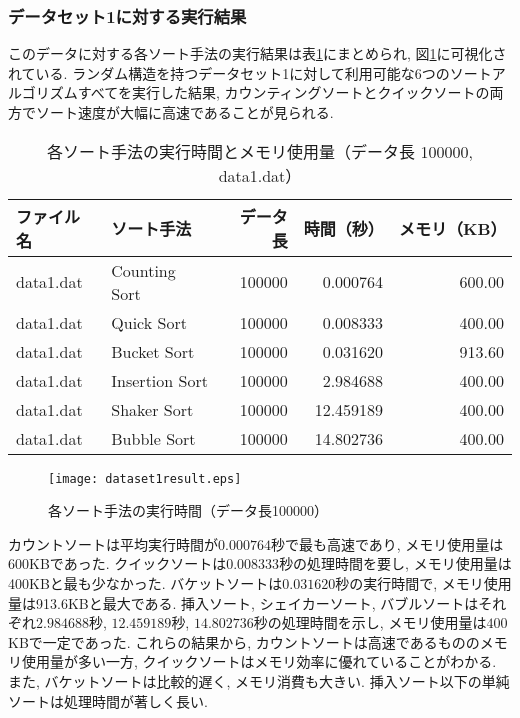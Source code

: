 \documentclass[a4j, 11pt]{jarticle}
\begin{document}
\subsubsection{データセット1に対する実行結果}
このデータに対する各ソート手法の実行結果は表\ref{dataset1allresult}にまとめられ, 図\ref{dataset1allresultgraph}に可視化されている. ランダム構造を持つデータセット1に対して利用可能な6つのソートアルゴリズムすべてを実行した結果, カウンティングソートとクイックソートの両方でソート速度が大幅に高速であることが見られる.  \
\begin{table}[H]
  \centering
  \caption{各ソート手法の実行時間とメモリ使用量（データ長 100000, data1.dat）}\label{dataset1allresult}
  \begin{tabular}{|l|l|r|r|r|}
    \hline
    \textbf{ファイル名} & \textbf{ソート手法} & \textbf{データ長} & \textbf{時間（秒）} & \textbf{メモリ（KB）} \\
    \hline
    data1.dat & Counting Sort  & 100000 & 0.000764  & 600.00 \\
    data1.dat & Quick Sort     & 100000 & 0.008333  & 400.00 \\
    data1.dat & Bucket Sort    & 100000 & 0.031620  & 913.60 \\
    data1.dat & Insertion Sort & 100000 & 2.984688  & 400.00 \\
    data1.dat & Shaker Sort    & 100000 & 12.459189 & 400.00 \\
    data1.dat & Bubble Sort    & 100000 & 14.802736 & 400.00 \\
    \hline
  \end{tabular}
\end{table}
\begin{figure}[H]
  \centering
  \texttt{[image: dataset1result.eps]}
  \caption{各ソート手法の実行時間（データ長100000）}\label{dataset1allresultgraph}
\end{figure}
カウントソートは平均実行時間が$0.000764$秒で最も高速であり, メモリ使用量は600KBであった. 
クイックソートは$0.008333$秒の処理時間を要し, メモリ使用量は400KBと最も少なかった. 
バケットソートは$0.031620$秒の実行時間で, メモリ使用量は913.6KBと最大である. 
挿入ソート, シェイカーソート, バブルソートはそれぞれ$2.984688$秒, $12.459189$秒, $14.802736$秒の処理時間を示し, メモリ使用量は$400$KBで一定であった. 
これらの結果から, カウントソートは高速であるもののメモリ使用量が多い一方, クイックソートはメモリ効率に優れていることがわかる. また, バケットソートは比較的遅く, メモリ消費も大きい. 挿入ソート以下の単純ソートは処理時間が著しく長い. \
\end{document}
